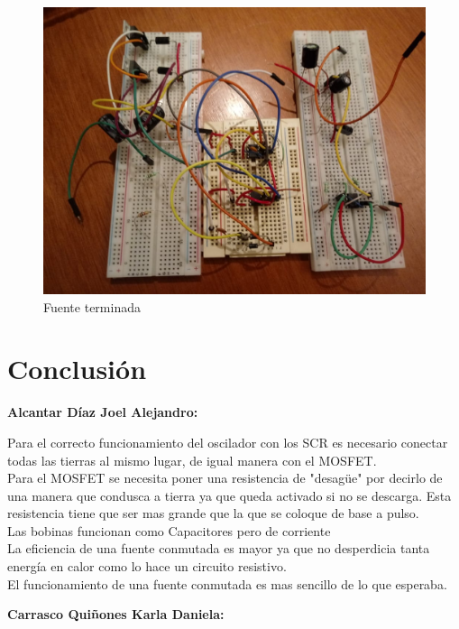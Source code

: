 \documentclass[letterpaper]{article}
\begin{document}
\begin{figure}[htbp]
    \centering
    \includegraphics[scale=0.2]{IMG/FinalFisico.jpeg}
    \caption{Fuente terminada}
    \label{fig:Allaenlafuente}
\end{figure}

\newpage
\section{Conclusión}
\textbf{Alcantar Díaz Joel Alejandro:\\}
\begin{large}
    Para el correcto funcionamiento del oscilador con los SCR es necesario conectar todas las tierras al mismo lugar, de igual manera con el MOSFET.\\
    Para el MOSFET se necesita poner una resistencia de "desagüe" por decirlo de una manera que condusca a tierra ya que queda activado si no se descarga. Esta resistencia tiene que ser mas grande que la que se coloque de base a pulso.\\
    Las bobinas funcionan como Capacitores pero de corriente\\
    La eficiencia de una fuente conmutada es mayor ya que no desperdicia tanta energía en calor como lo hace un circuito resistivo.\\
    El funcionamiento de una fuente conmutada es mas sencillo de lo que esperaba.
\end{large}



\textbf{Carrasco Quiñones Karla Daniela:\\}
\end{document}
